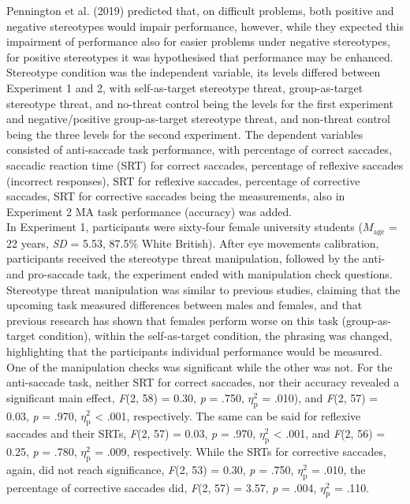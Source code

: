\documentclass[
  stu,floatsintext]{apa7}
\begin{document}
Pennington et al. (2019) predicted that, on difficult problems, both positive and negative stereotypes would impair performance, however, while they expected this impairment of performance also for easier problems under negative stereotypes, for positive stereotypes it was hypothesised that performance may be enhanced.\\
Stereotype condition was the independent variable, its levels differed between Experiment 1 and 2, with self-as-target stereotype threat, group-as-target stereotype threat, and no-threat control being the levels for the first experiment and negative/positive group-as-target stereotype threat, and non-threat control being the three levels for the second experiment.
The dependent variables consisted of anti-saccade task performance, with percentage of correct saccades, saccadic reaction time (SRT) for correct saccades, percentage of reflexive saccades (incorrect responses), SRT for reflexive saccades, percentage of corrective saccades, SRT for corrective saccades being the measurements, also in Experiment 2 MA task performance (accuracy) was added.\\
In Experiment 1, participants were sixty-four female university students (\(M_{\text{age}}\) = 22 years, \emph{SD} = 5.53, 87.5\% White British).
After eye movements calibration, participants received the stereotype threat manipulation, followed by the anti- and pro-saccade task, the experiment ended with manipulation check questions.
Stereotype threat manipulation was similar to previous studies, claiming that the upcoming task measured differences between males and females, and that previous research has shown that females perform worse on this task (group-as-target condition), within the self-as-target condition, the phrasing was changed, highlighting that the participants individual performance would be measured.\\
One of the manipulation checks was significant while the other was not.
For the anti-saccade task, neither SRT for correct saccades, nor their accuracy revealed a significant main effect, \emph{F}(2, 58) = 0.30, \emph{p} = .750, \(\eta^{2}_{\text{p}}\) = .010), and \emph{F}(2, 57) = 0.03, \emph{p} = .970, \(\eta^{2}_{\text{p}}\) \textless{} .001, respectively.
The same can be said for reflexive saccades and their SRTs, \emph{F}(2, 57) = 0.03, \emph{p} = .970, \(\eta^{2}_{\text{p}}\) \textless{} .001, and \emph{F}(2, 56) = 0.25, \emph{p} = .780, \(\eta^{2}_{\text{p}}\) = .009, respectively.
While the SRTs for corrective saccades, again, did not reach significance, \emph{F}(2, 53) = 0.30, \emph{p} = .750, \(\eta^{2}_{\text{p}}\) = .010, the percentage of corrective saccades did, \emph{F}(2, 57) = 3.57, \emph{p} = .004, \(\eta^{2}_{\text{p}}\) = .110.\\
\end{document}
